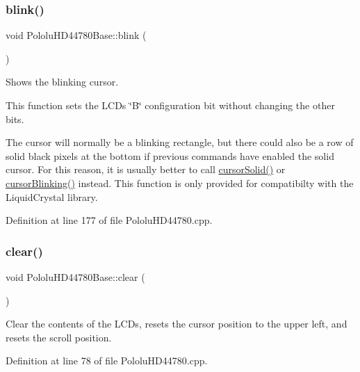 \mbox{\label{class_pololu_h_d44780_base_ac6e255adf32d5c70c0163422b1ae8e0c}} 
\subsubsection{\texorpdfstring{blink()}{blink()}}
{\footnotesize\ttfamily void Pololu\+H\+D44780\+Base\+::blink (\begin{DoxyParamCaption}{ }\end{DoxyParamCaption})}

Shows the blinking cursor.

This function sets the L\+CD\textquotesingle{}s \char`\"{}\+B\char`\"{} configuration bit without changing the other bits.

The cursor will normally be a blinking rectangle, but there could also be a row of solid black pixels at the bottom if previous commands have enabled the solid cursor. For this reason, it is usually better to call \hyperlink{class_pololu_h_d44780_base_a6a4d8e79beda9f7c81659a8e13c8c338}{cursor\+Solid()} or \hyperlink{class_pololu_h_d44780_base_a6a53a6cffbb77953b5a2c4ae49e288de}{cursor\+Blinking()} instead. This function is only provided for compatibilty with the Liquid\+Crystal library. 

Definition at line 177 of file Pololu\+H\+D44780.\+cpp.

\mbox{\label{class_pololu_h_d44780_base_a4d35e9a47ceef1a7582e180165e0eae1}} 
\subsubsection{\texorpdfstring{clear()}{clear()}}
{\footnotesize\ttfamily void Pololu\+H\+D44780\+Base\+::clear (\begin{DoxyParamCaption}{ }\end{DoxyParamCaption})}

Clear the contents of the L\+C\+Ds, resets the cursor position to the upper left, and resets the scroll position. 

Definition at line 78 of file Pololu\+H\+D44780.\+cpp.

\mbox{\label{class_pololu_h_d44780_base_a449ad8d9ff7afb90667da0003a39af3b}} 
